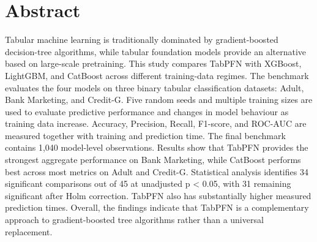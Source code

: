 \section{Abstract}\label{abstract}

Tabular machine learning is traditionally dominated by gradient-boosted decision-tree algorithms, while tabular foundation models provide an alternative based on large-scale pretraining. This study compares TabPFN with XGBoost, LightGBM, and CatBoost across different training-data regimes. The benchmark evaluates the four models on three binary tabular classification datasets: Adult, Bank Marketing, and Credit-G. Five random seeds and multiple training sizes are used to evaluate predictive performance and changes in model behaviour as training data increase. Accuracy, Precision, Recall, F1-score, and ROC-AUC are measured together with training and prediction time. The final benchmark contains 1,040 model-level observations. Results show that TabPFN provides the strongest aggregate performance on Bank Marketing, while CatBoost performs best across most metrics on Adult and Credit-G. Statistical analysis identifies 34 significant comparisons out of 45 at unadjusted p \textless{} 0.05, with 31 remaining significant after Holm correction. TabPFN also has substantially higher measured prediction times. Overall, the findings indicate that TabPFN is a complementary approach to gradient-boosted tree algorithms rather than a universal replacement.
